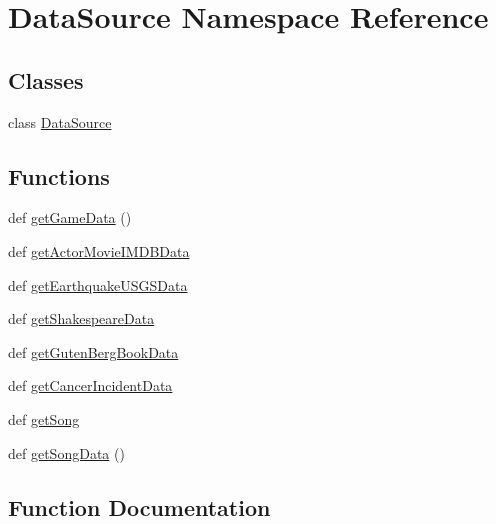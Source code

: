 \hypertarget{namespace_data_source}{}\section{Data\+Source Namespace Reference}
\label{namespace_data_source}
\subsection*{Classes}
\begin{DoxyCompactItemize}
\item 
class \hyperlink{class_data_source_1_1_data_source}{Data\+Source}
\end{DoxyCompactItemize}
\subsection*{Functions}
\begin{DoxyCompactItemize}
\item 
def \hyperlink{namespace_data_source_aab7eb11aaa419d49be353c5e2fb524ea}{get\+Game\+Data} ()
\item 
def \hyperlink{namespace_data_source_ac3690f0126c4c7e1a25c1e983d812330}{get\+Actor\+Movie\+I\+M\+D\+B\+Data}
\item 
def \hyperlink{namespace_data_source_a47583dbf1a7ff85995e5fc5e1941289f}{get\+Earthquake\+U\+S\+G\+S\+Data}
\item 
def \hyperlink{namespace_data_source_af729b48d7dd30c5c683fb5f449debd41}{get\+Shakespeare\+Data}
\item 
def \hyperlink{namespace_data_source_a5a6fce8b3bcbbdd57e9492e2c2e8a461}{get\+Guten\+Berg\+Book\+Data}
\item 
def \hyperlink{namespace_data_source_a20e64f5b526fd580aad8f1d8ac661736}{get\+Cancer\+Incident\+Data}
\item 
def \hyperlink{namespace_data_source_ad6b523fe3608bb69f2b7af9a407b24fb}{get\+Song}
\item 
def \hyperlink{namespace_data_source_ac1303ef651f863ace2ede2dfaca43817}{get\+Song\+Data} ()
\end{DoxyCompactItemize}


\subsection{Function Documentation}
\hypertarget{namespace_data_source_ac3690f0126c4c7e1a25c1e983d812330}{}
